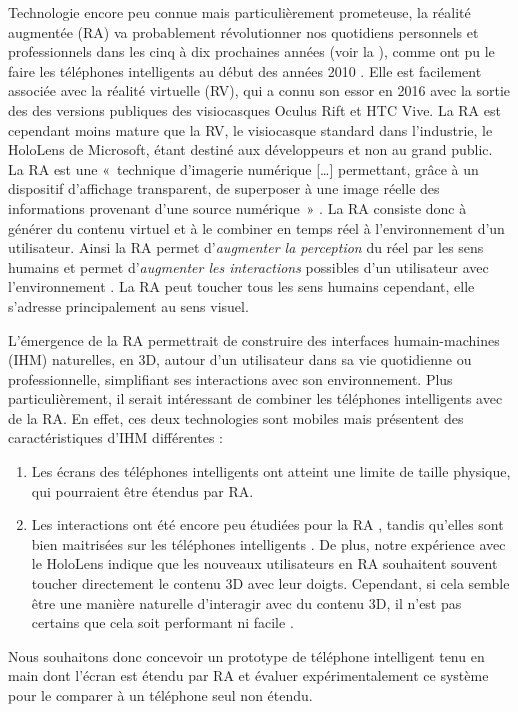 Technologie encore peu connue mais particulièrement prometeuse, la réalité augmentée (RA) va probablement révolutionner nos quotidiens personnels et professionnels dans les cinq à dix prochaines années (voir la ), comme ont pu le faire les téléphones intelligents au début des années 2010 \citet{Chaffey2018}. Elle est facilement associée avec la réalité virtuelle (RV), qui a connu son essor en 2016 avec la sortie des des versions publiques des visiocasques Oculus Rift et HTC Vive. La RA est cependant moins mature que la RV, le visiocasque standard dans l'industrie, le HoloLens de Microsoft, étant destiné aux développeurs et non au grand public.\\
La RA est une «~technique d'imagerie numérique […] permettant, grâce à un dispositif d'affichage transparent, de superposer à une image réelle des informations provenant d'une source numérique~» \citep{OfficeQuebecoisLangueFrancaiseRA2015}. La RA consiste donc à générer du contenu virtuel et à le combiner en temps réel à l'environnement d'un utilisateur. Ainsi la RA permet d'\emph{augmenter la perception} du réel par les sens humains et permet d'\emph{augmenter les interactions} possibles d'un utilisateur avec l'environnement \citep{Azuma1997}. La RA peut toucher tous les sens humains cependant, elle s'adresse principalement au sens visuel.

L'émergence de la RA permettrait de construire des interfaces humain-machines (IHM) naturelles, en 3D, autour d'un utilisateur dans sa vie quotidienne ou professionnelle, simplifiant ses interactions avec son environnement. Plus particulièrement, il serait intéressant de combiner les téléphones intelligents avec de la RA. En effet, ces deux technologies sont mobiles mais présentent des caractéristiques d'IHM différentes :
\begin{enumerate}
  \item Les écrans des téléphones intelligents ont atteint une limite de taille physique, qui pourraient être étendus par RA.
  \item Les interactions ont été encore peu étudiées pour la RA \citep{Piumsomboon2013}, tandis qu'elles sont bien maitrisées sur les téléphones intelligents \citep{Wobbrock2009}. De plus, notre expérience avec le HoloLens indique que les nouveaux utilisateurs en RA souhaitent souvent toucher directement le contenu 3D avec leur doigts. Cependant, si cela semble être une manière naturelle d'interagir avec du contenu 3D, il n'est pas certains que cela soit performant ni facile \citep{ChanKaoChenEtAl2010}.
\end{enumerate}
Nous souhaitons donc concevoir un prototype de téléphone intelligent tenu en main dont l'écran est étendu par RA et évaluer expérimentalement ce système pour le comparer à un téléphone seul non étendu.

